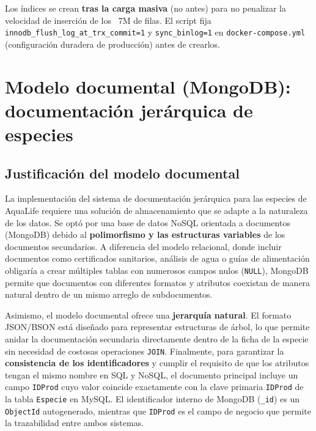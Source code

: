 \documentclass[11pt, a4paper]{article}
\begin{document}
Los índices se crean \textbf{tras la carga masiva} (no antes) para no penalizar la velocidad de inserción de los ~7M de filas. El script fija \texttt{innodb\_flush\_log\_at\_trx\_commit=1} y \texttt{sync\_binlog=1} en \texttt{docker-compose.yml} (configuración duradera de producción) antes de crearlos.

\section{Modelo documental (MongoDB): documentación jerárquica de especies}\label{sec:doc}

\subsection{Justificación del modelo documental}
La implementación del sistema de documentación jerárquica para las especies de AquaLife requiere una solución de almacenamiento que se adapte a la naturaleza de los datos. Se optó por una base de datos NoSQL orientada a documentos (MongoDB) debido al \textbf{polimorfismo y las estructuras variables} de los documentos secundarios. A diferencia del modelo relacional, donde incluir documentos como certificados sanitarios, análisis de agua o guías de alimentación obligaría a crear múltiples tablas con numerosos campos nulos (\texttt{NULL}), MongoDB permite que documentos con diferentes formatos y atributos coexistan de manera natural dentro de un mismo arreglo de subdocumentos.

Asimismo, el modelo documental ofrece una \textbf{jerarquía natural}. El formato JSON/BSON está diseñado para representar estructuras de árbol, lo que permite anidar la documentación secundaria directamente dentro de la ficha de la especie sin necesidad de costosas operaciones \texttt{JOIN}. Finalmente, para garantizar la \textbf{consistencia de los identificadores} y cumplir el requisito de que los atributos tengan el mismo nombre en SQL y NoSQL, el documento principal incluye un campo \texttt{IDProd} cuyo valor coincide exactamente con la clave primaria \texttt{IDProd} de la tabla \texttt{Especie} en MySQL. El identificador interno de MongoDB (\texttt{\_id}) es un \texttt{ObjectId} autogenerado, mientras que \texttt{IDProd} es el campo de negocio que permite la trazabilidad entre ambos sistemas.
\end{document}
